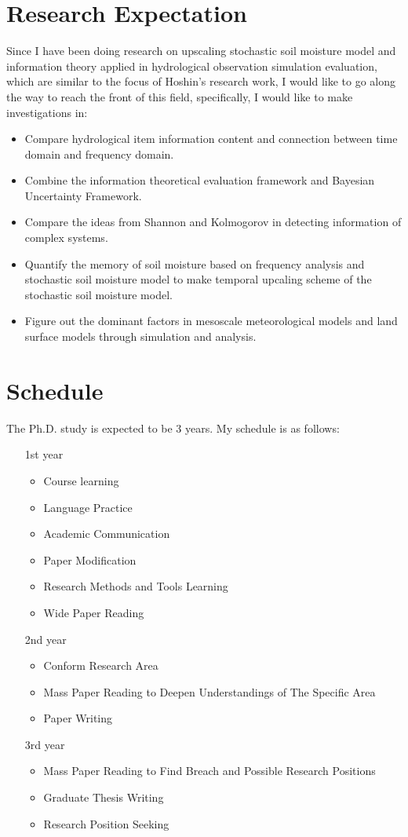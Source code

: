 \documentclass[a4paper, 12pt]{scrartcl}
\begin{document}
\section{Research Expectation}
Since I have been doing research on upscaling stochastic soil moisture model and information theory applied in hydrological observation simulation evaluation, which are similar to the focus of Hoshin's research work, I would like to go along the way to reach the front of this field, specifically, I would like to make investigations in:
\begin{itemize}
\item Compare hydrological item information content and connection between time domain and frequency domain. 
\item Combine the information theoretical evaluation framework and Bayesian Uncertainty Framework.
\item Compare the ideas from Shannon and Kolmogorov in detecting information of complex systems.
\item Quantify the memory of soil moisture based on frequency analysis and stochastic soil moisture model to make temporal upcaling scheme of  the stochastic soil moisture model.
\item Figure out the dominant factors in mesoscale meteorological models and land surface models through simulation and analysis. 
\end{itemize} 

\section{Schedule}
The Ph.D. study is expected to be 3 years. My schedule is as follows:
\begin{itemize}
\item[1st year] 
\begin{itemize}
\item Course learning
\item Language Practice
\item Academic Communication
\item Paper Modification
\item Research Methods and Tools Learning
\item Wide Paper Reading
\end{itemize}
\item[2nd year] 
\begin{itemize}
\item Conform Research Area 
\item Mass Paper Reading to Deepen Understandings of The Specific Area
\item Paper Writing
\end{itemize}
\item[3rd year]
\begin{itemize}
\item Mass Paper Reading to Find Breach and Possible Research Positions
\item Graduate Thesis Writing
\item Research Position Seeking
\end{itemize}
\end{itemize}
 
\end{document}
